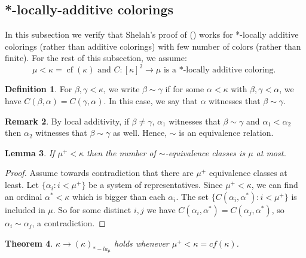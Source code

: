 \documentclass[11pt]{amsart}
\theoremstyle{plain}
\newtheorem{theorem}{Theorem}[section]
\newtheorem{lemma}[theorem]{Lemma}
\theoremstyle{definition} %
\newtheorem{definition}[theorem]{Definition}
\newtheorem{remark}[theorem]{Remark}
\theoremstyle{remark}
\newcommand{\cf}{\operatorname{cf}}
\begin{document}
\subsection{*-locally-additive colorings}
In this subsection we verify that Shelah's proof of (\cite[Theorem 1.1]{sh42}) works for *-locally additive colorings (rather than additive colorings) with few number of colors (rather than finite).
For the rest of this subsection, we assume:
\[
\mu<\kappa=\cf(\kappa) \text{ and }
C:[\kappa]^2 \to \mu \text{ is a *-locally additive coloring. }
\]


\begin{definition}
For $\beta,\gamma<\kappa$, we write $\beta \sim \gamma$ if for some $\alpha<\kappa$ with $\beta,\gamma<\alpha$, we have $C(\beta,\alpha)=C(\gamma,\alpha)$. In this case, we say that $\alpha$ witnesses that $\beta \sim \gamma$.
\end{definition}

\begin{remark}\label{remark 7.2}
By local additivity, if $\beta \neq \gamma$, $\alpha_1$ witnesses that $\beta \sim \gamma$ and $\alpha_1<\alpha_2$ then $\alpha_2$ witnesses that $\beta \sim \gamma$ as well. Hence, $\sim$ is an equivalence relation.
\end{remark}

\begin{lemma}\label{lemma number of equivalence classes}
If $\mu^+<\kappa$ then
the number of $\sim$-equivalence classes is $\mu$ at most.
\end{lemma}

\begin{proof}
Assume towards contradiction that there are $\mu^+$ equivalence classes at least. Let $\{\alpha_i:i<\mu^+\}$ be a system of representatives. Since $\mu^+<\kappa$, we can find an ordinal $\alpha^*<\kappa$ which is bigger than each $\alpha_i$. The set $\{C(\alpha_i,\alpha^*):i<\mu^+\}$ is included in $\mu$. So for some distinct $i,j$ we have $C(\alpha_i,\alpha^*)=C(\alpha_j,\alpha^*)$, so $\alpha_i \sim \alpha_j$, a contradiction.
\end{proof}


\begin{theorem}\label{theorem shelah *-locally-additive}
$\kappa \rightarrow (\kappa)_{*-la_\mu}$ holds whenever $\mu^+<\kappa=cf(\kappa)$.
\end{theorem}
\end{document}
